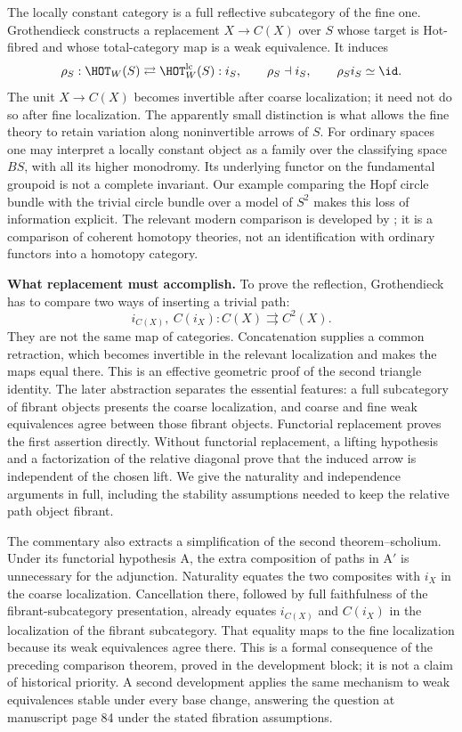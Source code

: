 The locally constant category is a full reflective subcategory of the fine
one. Grothendieck constructs a replacement $X\to C(X)$ over $S$ whose target
is Hot-fibred and whose total-category map is a weak equivalence. It induces
\[
 \rho_S:\HOT_W(S)\rightleftarrows
 \HOT_W^{\mathrm{lc}}(S):i_S,
 \qquad \rho_S\dashv i_S,
 \qquad \rho_S i_S\simeq\id.
\]
The unit $X\to C(X)$ becomes invertible after coarse localization; it need
not do so after fine localization. The apparently small distinction is what
allows the fine theory to retain variation along noninvertible arrows of
$S$. For ordinary spaces one may interpret a locally constant object as a
family over the classifying space $BS$, with all its higher monodromy. Its
underlying functor on the fundamental groupoid is not a complete invariant.
Our example comparing the Hopf circle bundle with the trivial circle bundle
over a model of $S^2$ makes this loss of information explicit. The relevant
modern comparison is developed by \citet[\S\S2--4]{Cisinski2009LocallyConstant};
it is a comparison of coherent homotopy theories, not an identification with
ordinary functors into a homotopy category.

\medskip
\noindent\textbf{What replacement must accomplish.}
To prove the reflection, Grothendieck has to compare two ways of inserting a
trivial path:
\[
 i_{C(X)},\ C(i_X):C(X)\rightrightarrows C^2(X).
\]
They are not the same map of categories. Concatenation supplies a common
retraction, which becomes invertible in the relevant localization and makes
the maps equal there. This is an effective geometric proof of the second
triangle identity. The later abstraction separates the essential features:
a full subcategory of fibrant objects presents the coarse localization, and
coarse and fine weak equivalences agree between those fibrant objects.
Functorial replacement proves the first assertion directly. Without
functorial replacement, a lifting hypothesis and a factorization of the
relative diagonal prove that the induced arrow is independent of the chosen
lift. We give the naturality and independence arguments in full, including
the stability assumptions needed to keep the relative path object fibrant.

The commentary also extracts a simplification of the second
theorem--scholium. Under its functorial hypothesis A, the extra composition
of paths in A$'$ is unnecessary for the adjunction. Naturality equates the
two composites with $i_X$ in the coarse localization. Cancellation there,
followed by full faithfulness of the fibrant-subcategory presentation,
already equates $i_{C(X)}$ and $C(i_X)$ in the localization of the fibrant
subcategory. That equality maps to the fine localization because its weak
equivalences agree there. This is a formal consequence of the preceding
comparison theorem, proved in the development block; it is not a claim of
historical priority. A second development applies the same mechanism to
weak equivalences stable under every base change, answering the question at
manuscript page 84 under the stated fibration assumptions.


